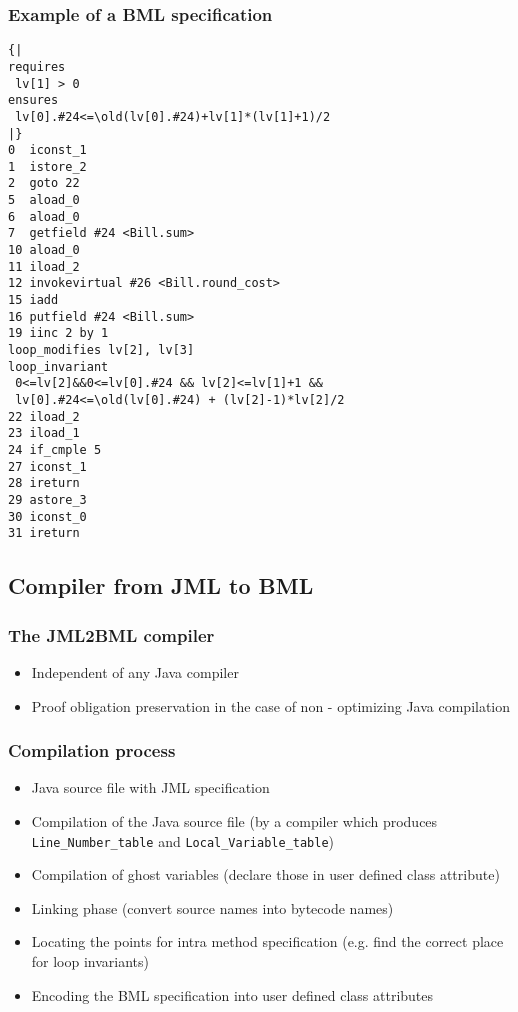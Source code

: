 \documentclass[c]{beamer}
\begin{document}
\begin{frame}\frametitle{Example of a BML specification}

 \begin{lstlisting}[language=jvmis]
{|
requires 
 lv[1] > 0 
ensures 
 lv[0].#24<=\old(lv[0].#24)+lv[1]*(lv[1]+1)/2
|}
0  iconst_1
1  istore_2
2  goto 22 
5  aload_0
6  aload_0
7  getfield #24 <Bill.sum>
10 aload_0
11 iload_2
12 invokevirtual #26 <Bill.round_cost>
15 iadd
16 putfield #24 <Bill.sum>
19 iinc 2 by 1
loop_modifies lv[2], lv[3] 
loop_invariant 
 0<=lv[2]&&0<=lv[0].#24 && lv[2]<=lv[1]+1 &&
 lv[0].#24<=\old(lv[0].#24) + (lv[2]-1)*lv[2]/2
22 iload_2
23 iload_1
24 if_cmple 5 
27 iconst_1
28 ireturn
29 astore_3
30 iconst_0
31 ireturn
\end{lstlisting}
\end{frame}

\subsection{Compiler from JML to BML}

 \begin{frame}\frametitle{The JML2BML compiler}
   \begin{itemize}
         \item Independent  of any Java compiler
	 \item Proof obligation preservation 
	       in the case of non - optimizing Java compilation 
   \end{itemize}
   \end{frame}


\begin{frame}\frametitle{Compilation process}
     
     \begin{itemize}
         \item Java source file with JML specification 
          \item Compilation of the Java source file (by a compiler which produces \texttt{Line\_Number\_table} and 
 \texttt{Local\_Variable\_table})
	    \item Compilation of ghost variables (declare those in user defined class attribute)
		\item Linking phase (convert source names into bytecode names)
		  \item Locating the points for intra method specification (e.g. find the correct place for loop invariants)
		    \item Encoding the BML specification into user defined class attributes
       \end{itemize}
\end{frame}
\end{document}
